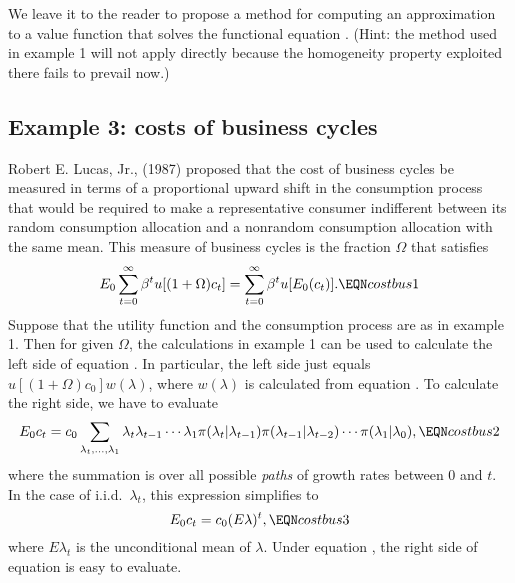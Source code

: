   We leave it to the reader to propose a method for computing an
  approximation to a value function that solves the functional equation
  .  (Hint: the method used in example 1 will not apply
  directly because the homogeneity property exploited there fails
  to prevail now.)





\subsection{Example 3:  costs of business cycles}
Robert E. Lucas, Jr.,  (1987) proposed that the cost of
business cycles be measured in terms of a proportional
upward shift  in the consumption process that would be required
to make  a representative consumer indifferent between  its
random consumption allocation and a nonrandom consumption
allocation with the same mean.     This measure of business
cycles is the  fraction $\Omega$ that satisfies
$$ E_0 \sum_{t=0}^\infty \beta^t u[(1+\Omega) c_t ]
         = \sum_{t=0}^\infty \beta^t u[E_0(c_t)]. \EQN costbus1  $$
Suppose that the utility function and the consumption process
are as in example 1.   Then for given $\Omega$,    the
calculations in example 1 can be used to calculate
the left side of  equation .   In particular,  the left
side just equals $u[(1+\Omega) c_0] w(\lambda)$, where
$w(\lambda)$  is calculated from equation .    To calculate
the right side, we have to evaluate
$$ E_0 c_t = c_0 \sum_{\lambda_t,  \ldots  ,\lambda_1}
     \lambda_t \lambda_{t-1} \cdots \lambda_1 \pi(\lambda_t
     |  \lambda_{t-1}) \pi(\lambda_{t-1} | \lambda_{t-2})
     \cdots \pi(\lambda_1 | \lambda_0), \EQN costbus2 $$
where the summation is  over all possible {\it paths\/} of growth
rates between $0$  and $t$. In the case of i.i.d.\ $\lambda_t$,
this expression simplifies to
 $$  E_0 c_t = c_0 (E \lambda)^t, \EQN  costbus3 $$
where $E \lambda_t$ is the unconditional mean of $\lambda$.
Under equation , the right side of  equation 
is easy to evaluate.

